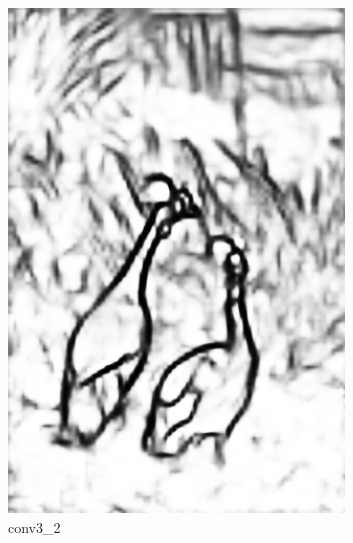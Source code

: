 \documentclass[a4paper]{ctexart}
\begin{document}
\begin{figure}[htb]
\begin{subfigure}{0.2\textwidth}
			\includegraphics[width=\linewidth]{picture/LLIE/RCF/conv3_2}
			\captionsetup{font=scriptsize}
			\caption{conv3\_2}
			\label{fig: conv3_2}	
		\end{subfigure}\\
		\begin{subfigure}{0.2\textwidth}

\end{subfigure}
\end{figure}
\end{document}
